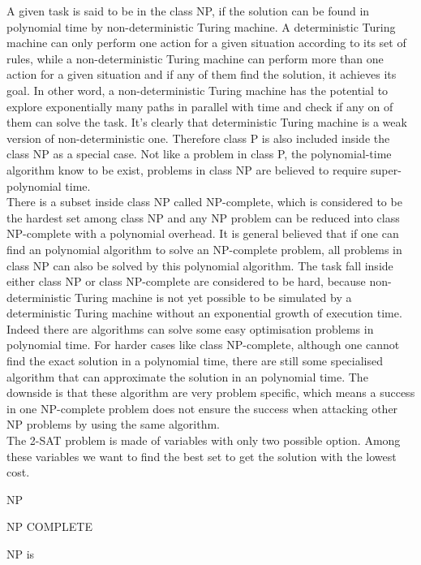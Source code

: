 \documentclass[twoside,a4paper,article]{combine}
\begin{document}
A given task is said to be in the class NP, if the solution can be found in polynomial time by non-deterministic Turing machine. A deterministic Turing machine can only perform one action for a given situation according to its set of rules, while a non-deterministic Turing machine can perform more than one action for a given situation and if any of them find the solution, it achieves its goal. In other word, a non-deterministic Turing machine has the potential to explore exponentially many paths in parallel with time and check if any on of them can solve the task. It's clearly that deterministic Turing machine is a weak version of non-deterministic one. Therefore class P is also included inside the class NP as a special case. Not like a problem in class P, the polynomial-time algorithm know to be exist, problems in class NP are believed to require super-polynomial time. \\

There is a subset inside class NP called NP-complete, which is considered to be the hardest set among class NP and any NP problem can be reduced into class NP-complete with a polynomial overhead. It is general believed that if one can find an polynomial algorithm to solve an NP-complete problem, all problems in class NP can also be solved by this polynomial algorithm.  The task fall inside either class NP or class NP-complete are considered to be hard, because non-deterministic Turing machine is not yet possible to be simulated by a deterministic Turing machine without an exponential growth of execution time. \\ 

Indeed there are algorithms can solve some easy optimisation problems in polynomial time. For harder cases like class NP-complete, although one cannot find the exact solution in a polynomial time, there are still some specialised algorithm that can approximate the solution in an polynomial time. The downside is that these algorithm are very problem specific, which means a success in one NP-complete problem does not ensure the success when attacking other NP problems by using the same algorithm. \\



The 2-SAT problem is made of variables with only two possible option. Among these variables we want to find the best set to get the solution with the lowest cost. 

NP

NP COMPLETE

NP is 
\end{document}
